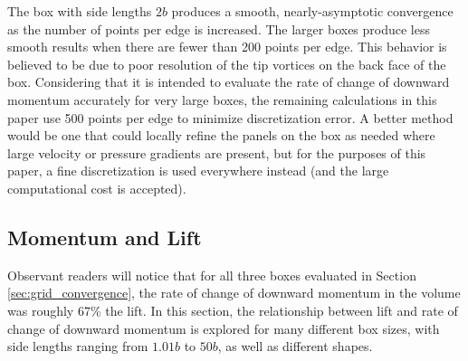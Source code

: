\documentclass[11pt]{article}
\begin{document}
The box with side lengths $2b$ produces a smooth, nearly-asymptotic convergence
as the number of points per edge is increased. The larger boxes produce less
smooth results
when there are fewer than 200 points per edge. This behavior is believed to be
due to poor resolution of the tip vortices on the back face of the box.
Considering that it is intended to evaluate the rate of change of downward
momentum accurately for very large boxes, the remaining calculations in this
paper use 500 points per edge to minimize discretization error. A better method
would be one that could locally refine the panels on the box as needed where
large velocity or pressure gradients are present, but for the purposes of this
paper, a fine discretization is used everywhere instead (and the large
computational cost is accepted).

\subsection{Momentum and Lift}

Observant readers will notice that for all three boxes evaluated in Section
\ref{sec:grid_convergence}, the rate of change of downward momentum in the
volume was roughly 67\% the lift. In this section, the relationship between
lift and rate of change of downward momentum is explored for many different box
sizes, with side lengths ranging from $1.01b$ to $50b$, as well as different
shapes.
\end{document}
